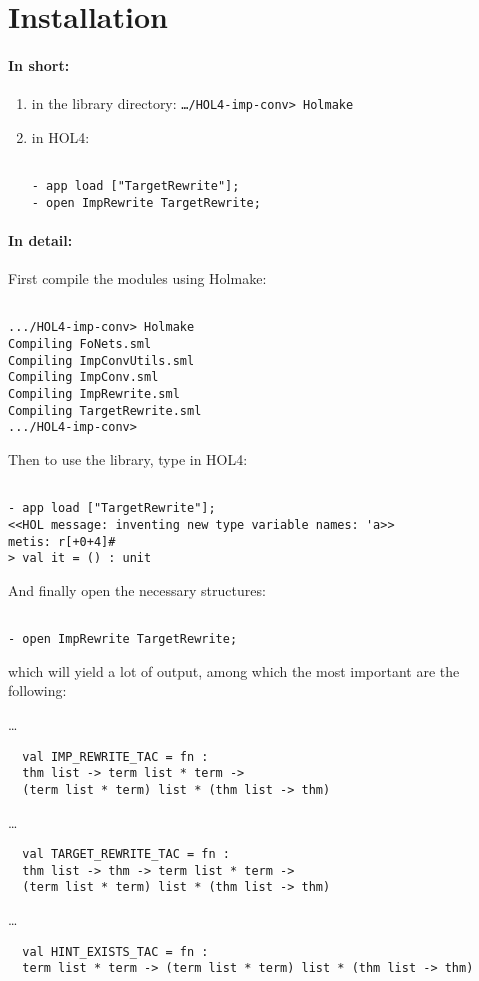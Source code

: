 \documentclass{llncs}
\begin{document}
  \section{Installation}
    \paragraph{In short:}
    \begin{enumerate}
      \item in the library directory: \texttt{\ldots/HOL4-imp-conv> Holmake}
      \item in HOL4:
        \begin{verbatim}

- app load ["TargetRewrite"];
- open ImpRewrite TargetRewrite;\end{verbatim}
    \end{enumerate}

    \bigskip
    \paragraph{In detail:}
    First compile the modules using Holmake:
    \begin{verbatim}

.../HOL4-imp-conv> Holmake
Compiling FoNets.sml
Compiling ImpConvUtils.sml
Compiling ImpConv.sml
Compiling ImpRewrite.sml
Compiling TargetRewrite.sml
.../HOL4-imp-conv> \end{verbatim}

    Then to use the library, type in HOL4:
    \begin{verbatim}

- app load ["TargetRewrite"];
<<HOL message: inventing new type variable names: 'a>>
metis: r[+0+4]#
> val it = () : unit \end{verbatim}

    And finally open the necessary structures:
    \begin{verbatim}

- open ImpRewrite TargetRewrite; \end{verbatim}
which will yield a lot of output, among which the most important are the following:

\noindent
\ldots
\begin{verbatim}
  val IMP_REWRITE_TAC = fn :
  thm list -> term list * term ->
  (term list * term) list * (thm list -> thm)\end{verbatim}
\ldots
\begin{verbatim}
  val TARGET_REWRITE_TAC = fn :
  thm list -> thm -> term list * term ->
  (term list * term) list * (thm list -> thm)\end{verbatim}
\ldots
\begin{verbatim}
  val HINT_EXISTS_TAC = fn :
  term list * term -> (term list * term) list * (thm list -> thm)\end{verbatim}
\end{document}
